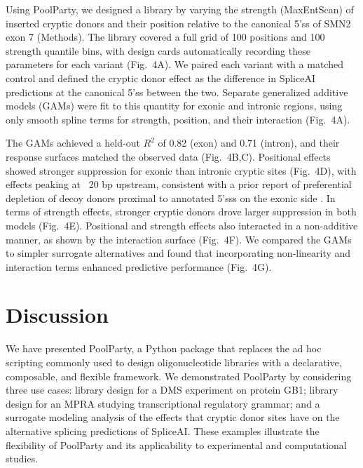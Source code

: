 \documentclass[unnumsec,webpdf,modern,large]{mam-authoring-template}%
\theoremstyle{thmstyleone}%
\theoremstyle{thmstyletwo}%
\theoremstyle{thmstylethree}%
\begin{document}
Using PoolParty, we designed a library by varying the strength (MaxEntScan) of inserted cryptic donors and their position relative to the canonical 5'ss of SMN2 exon 7 (Methods). The library covered a full grid of 100 positions and 100 strength quantile bins, with design cards automatically recording these parameters for each variant (Fig.~4A). We paired each variant with a matched control and defined the cryptic donor effect as the difference in SpliceAI predictions at the canonical 5'ss between the two. Separate generalized additive models (GAMs) were fit to this quantity for exonic and intronic regions, using only smooth spline terms for strength, position, and their interaction (Fig.~4A).

The GAMs achieved a held-out $R^2$ of 0.82 (exon) and 0.71 (intron), and their response surfaces matched the observed data (Fig.~4B,C). Positional effects showed stronger suppression for exonic than intronic cryptic sites (Fig.~4D), with effects peaking at ~20 bp upstream, consistent with a prior report of preferential depletion of decoy donors proximal to annotated 5'sss on the exonic side \citep{Dawes2022empirical}. In terms of strength effects, stronger cryptic donors drove larger suppression in both models (Fig.~4E). Positional and strength effects also interacted in a non-additive manner, as shown by the interaction surface (Fig.~4F). We compared the GAMs to simpler surrogate alternatives and found that incorporating non-linearity and interaction terms enhanced predictive performance (Fig.~4G).


\section{Discussion}

We have presented PoolParty, a Python package that replaces the ad hoc scripting commonly used to design oligonucleotide libraries with a declarative, composable, and flexible framework. We demonstrated PoolParty by considering three use cases: library design for a DMS experiment on protein GB1; library design for an MPRA studying transcriptional regulatory grammar; and a surrogate modeling analysis of the effects that cryptic donor sites have on the alternative splicing predictions of SpliceAI. These examples illustrate the flexibility of PoolParty and its applicability to experimental and computational studies.
\end{document}
